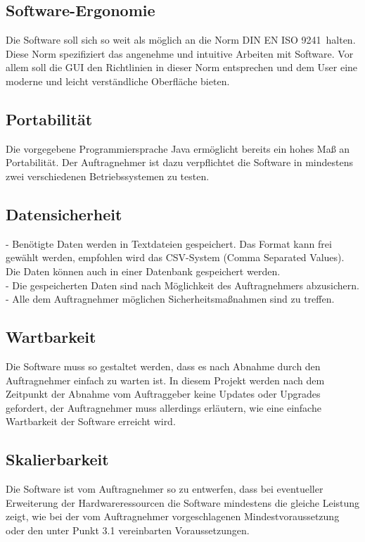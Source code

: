 \documentclass[12pt]{article}
\begin{document}
\subsection{Software-Ergonomie}
Die Software soll sich so weit als möglich an die Norm DIN EN ISO 9241\  halten. Diese Norm spezifiziert das angenehme und intuitive Arbeiten mit Software. Vor allem soll die GUI den Richtlinien in dieser Norm entsprechen und dem User eine moderne und leicht verständliche Oberfläche bieten.

\subsection{Portabilität}
Die vorgegebene Programmiersprache Java ermöglicht bereits ein hohes Maß an Portabilität. Der Auftragnehmer ist dazu verpflichtet die Software in mindestens zwei verschiedenen Betriebssystemen zu testen. 

\subsection{Datensicherheit}
- Benötigte Daten werden in Textdateien gespeichert. Das Format kann frei gewählt werden, empfohlen wird das CSV-System (Comma Separated Values). Die Daten können auch in einer  Datenbank gespeichert werden.\\
- Die gespeicherten Daten sind nach Möglichkeit des Auftragnehmers abzusichern.\\
- Alle dem Auftragnehmer möglichen Sicherheitsmaßnahmen sind zu treffen.

\subsection{Wartbarkeit}
Die Software muss so gestaltet werden, dass es nach Abnahme durch den Auftragnehmer einfach zu warten ist. In diesem Projekt werden nach dem Zeitpunkt der Abnahme vom Auftraggeber keine Updates oder Upgrades gefordert, der Auftragnehmer muss allerdings erläutern, wie eine einfache Wartbarkeit der Software erreicht wird.

\subsection{Skalierbarkeit}
Die Software ist vom Auftragnehmer so zu entwerfen, dass bei eventueller Erweiterung der Hardwareressourcen die Software mindestens die gleiche Leistung zeigt, wie bei der vom Auftragnehmer vorgeschlagenen Mindestvoraussetzung oder den unter Punkt 3.1 vereinbarten Voraussetzungen.
\end{document}
